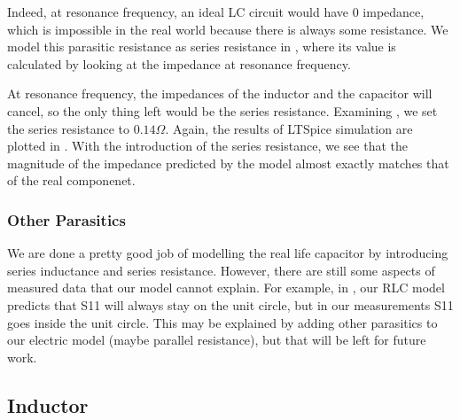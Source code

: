 \documentclass{article}
\begin{document}
Indeed, at resonance frequency, an ideal LC circuit would have $0$ impedance, which is impossible in the real world because there is always some resistance.
We model this parasitic resistance as series resistance in , where its value is calculated by looking at the impedance at resonance frequency.

At resonance frequency, the impedances of the inductor and the capacitor will cancel, so the only thing left would be the series resistance.
Examining , we set the series resistance to $0.14\Omega$.
Again, the results of LTSpice simulation are plotted in .
With the introduction of the series resistance, we see that the magnitude of the impedance predicted by the model almost exactly matches that of the real componenet.

\subsubsection{Other Parasitics}
We are done a pretty good job of modelling the real life capacitor by introducing series inductance and series resistance.
However, there are still some aspects of measured data that our model cannot explain.
For example, in , our RLC model predicts that S11 will always stay on the unit circle, but in our measurements S11 goes inside the unit circle.
This may be explained by adding other parasitics to our electric model (maybe parallel resistance), but that will be left for future work.

\subsection{Inductor}
\end{document}

